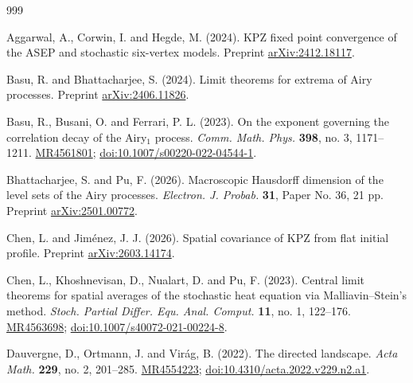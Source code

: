 \documentclass[12pt, reqno]{amsart}
\numberwithin{equation}{section}
\theoremstyle{definition}
\begin{document}
\begin{thebibliography}{999}

Aggarwal, A., Corwin, I. and Hegde, M. (2024).
KPZ fixed point convergence of the ASEP and stochastic six-vertex models.
Preprint \href{https://arxiv.org/abs/2412.18117}{arXiv:2412.18117}.

Basu, R. and Bhattacharjee, S. (2024).
Limit theorems for extrema of Airy processes.
Preprint \href{https://arxiv.org/abs/2406.11826}{arXiv:2406.11826}.

Basu, R., Busani, O. and Ferrari, P. L. (2023).
On the exponent governing the correlation decay of the Airy$_1$ process.
\textit{Comm. Math. Phys.} \textbf{398}, no. 3, 1171--1211.
\href{https://mathscinet.ams.org/mathscinet-getitem?mr=4561801}{MR4561801};
\href{https://doi.org/10.1007/s00220-022-04544-1}{doi:10.1007/s00220-022-04544-1}.

Bhattacharjee, S. and Pu, F. (2026).
Macroscopic Hausdorff dimension of the level sets of the Airy processes.
\textit{Electron. J. Probab.} \textbf{31}, Paper No. 36, 21 pp.
Preprint \href{https://arxiv.org/abs/2501.00772}{arXiv:2501.00772}.

Chen, L. and Jim\'enez, J. J. (2026).
Spatial covariance of KPZ from flat initial profile.
Preprint \href{https://arxiv.org/abs/2603.14174}{arXiv:2603.14174}.

Chen, L., Khoshnevisan, D., Nualart, D. and Pu, F. (2023).
Central limit theorems for spatial averages of the stochastic heat equation via Malliavin--Stein's method.
\textit{Stoch. Partial Differ. Equ. Anal. Comput.} \textbf{11}, no. 1, 122--176.
\href{https://mathscinet.ams.org/mathscinet-getitem?mr=4563698}{MR4563698};
\href{https://doi.org/10.1007/s40072-021-00224-8}{doi:10.1007/s40072-021-00224-8}.


Dauvergne, D., Ortmann, J. and Vir\'ag, B. (2022).
The directed landscape.
\textit{Acta Math.} \textbf{229}, no. 2, 201--285.
\href{https://mathscinet.ams.org/mathscinet-getitem?mr=4554223}{MR4554223};
\href{https://doi.org/10.4310/acta.2022.v229.n2.a1}{doi:10.4310/acta.2022.v229.n2.a1}.


\end{thebibliography}
\end{document}
